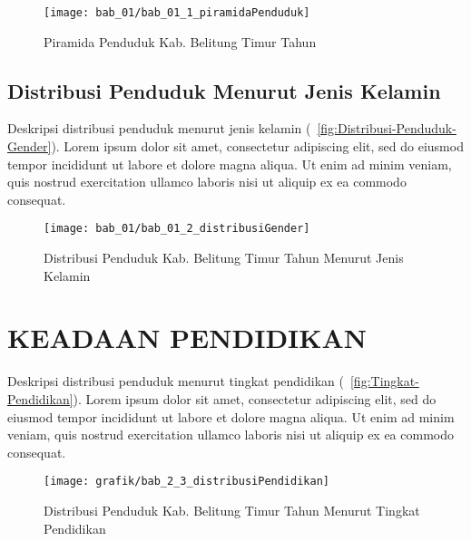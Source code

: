 \begin{figure}[!h]
    \centering{}
    \texttt{[image: bab\_01/bab\_01\_1\_piramidaPenduduk]}
    \caption{Piramida Penduduk Kab. Belitung Timur Tahun \tP}
    \label{fig:Piramida-Penduduk-2019}
\end{figure}

\subsection{Distribusi Penduduk Menurut Jenis Kelamin}
Deskripsi distribusi penduduk menurut jenis kelamin (~\autoref{fig:Distribusi-Penduduk-Gender}). Lorem ipsum dolor sit amet, consectetur adipiscing elit, sed do eiusmod tempor incididunt ut labore et dolore magna aliqua. Ut enim ad minim veniam, quis nostrud exercitation ullamco laboris nisi ut aliquip ex ea commodo consequat.

\begin{figure}[!h]
    \centering{}
    \texttt{[image: bab\_01/bab\_01\_2\_distribusiGender]}
    \caption{Distribusi Penduduk Kab. Belitung Timur Tahun \tP Menurut Jenis Kelamin}
    \label{fig:Distribusi-Penduduk-Gender}
\end{figure}

\section{KEADAAN PENDIDIKAN}
Deskripsi distribusi penduduk menurut tingkat pendidikan (~\autoref{fig:Tingkat-Pendidikan}). Lorem ipsum dolor sit amet, consectetur adipiscing elit, sed do eiusmod tempor incididunt ut labore et dolore magna aliqua. Ut enim ad minim veniam, quis nostrud exercitation ullamco laboris nisi ut aliquip ex ea commodo consequat.

\begin{figure}[H]
    \centering
    \texttt{[image: grafik/bab\_2\_3\_distribusiPendidikan]}
    \caption{Distribusi Penduduk Kab. Belitung Timur Tahun \tP Menurut Tingkat Pendidikan}
    \label{fig:Tingkat-Pendidikan}
\end{figure}
